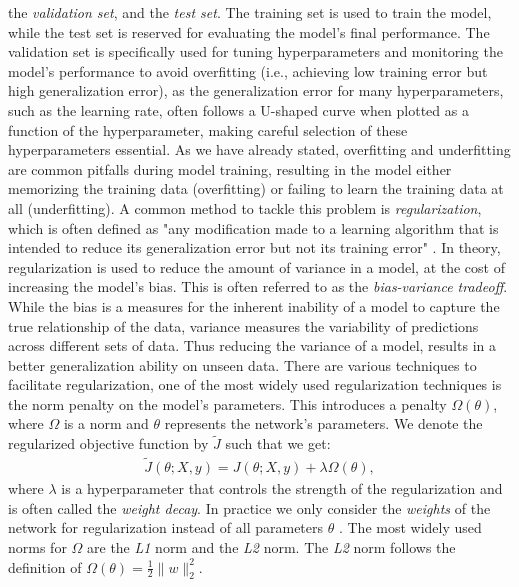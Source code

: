 the \emph{validation set}, and the \emph{test set}. The training set is used to train the model,
while the test set is reserved for evaluating the model's final performance. 
The validation set is specifically used for tuning hyperparameters and monitoring the model's performance to avoid overfitting
(i.e., achieving low training error but high generalization error), as the generalization error
for many hyperparameters, such as the learning rate, often follows a U-shaped curve when plotted as a function
of the hyperparameter, making careful selection of these hyperparameters essential.
As we have already stated, overfitting and underfitting are common pitfalls during model training, resulting in the model either memorizing the training data (overfitting) 
or failing to learn the training data at all (underfitting).
 A common method to tackle this problem is \emph{regularization}, which is often defined as "any modification made to a learning algorithm that
is intended to reduce its generalization error but not its training error" \cite{Goodfellow-et-al-2016}.
In theory, regularization is used to reduce the amount of variance in a model, at the cost of increasing the model's
 bias. This is often referred to as the \emph{bias-variance tradeoff}. While the bias is a measures for the inherent inability of
 a model to capture the true relationship of the data, variance measures the variability of predictions across different 
sets of data. Thus reducing the variance of a model, results in a better generalization ability on unseen data.\cite{IBMRegularization}
There are various techniques to facilitate regularization, one of 
the most widely used regularization techniques is the norm penalty on the model's parameters. This introduces a penalty
\(\Omega(\theta)\), where \(\Omega\) is a norm and \(\theta\) represents the network's parameters.
We denote the regularized objective function by \(\tilde{J}\) such that we get:
\begin{align}
\tilde{J}(\theta; X, y) = J(\theta; X, y) + \lambda \Omega(\theta),
\end{align}
where \(\lambda\) is a hyperparameter that controls the strength of the regularization and is often called the \emph{weight decay}.
In practice we only consider the \emph{weights} of the network for regularization instead of  all parameters \(\theta\) \cite{Goodfellow-et-al-2016}.
The most widely used norms for \(\Omega\) are the \emph{L1} norm and the \emph{L2} norm.
The \emph{L2} norm follows the definition of \(\Omega(\theta) = \frac{1}{2} \|w\|_2^2\).
